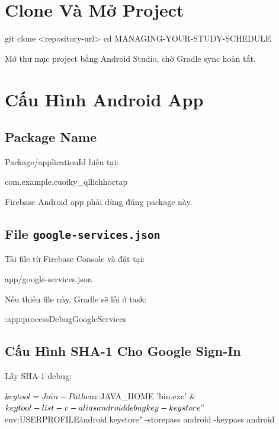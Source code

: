 \documentclass[12pt,a4paper]{report}
\begin{document}
\section{Clone Và Mở Project}

\begin{CodeBlock}
git clone <repository-url>
cd MANAGING-YOUR-STUDY-SCHEDULE
\end{CodeBlock}

Mở thư mục project bằng Android Studio, chờ Gradle sync hoàn tất.

\section{Cấu Hình Android App}

\subsection{Package Name}

Package/applicationId hiện tại:

\begin{CodeBlock}
com.example.cuoiky_qllichhoctap
\end{CodeBlock}

Firebase Android app phải dùng đúng package này.

\subsection{File \texttt{google-services.json}}

Tải file từ Firebase Console và đặt tại:

\begin{CodeBlock}
app/google-services.json
\end{CodeBlock}

Nếu thiếu file này, Gradle sẽ lỗi ở task:

\begin{CodeBlock}
:app:processDebugGoogleServices
\end{CodeBlock}

\subsection{Cấu Hình SHA-1 Cho Google Sign-In}

Lấy SHA-1 debug:

\begin{CodeBlock}
$keytool = Join-Path $env:JAVA_HOME 'bin\keytool.exe'
& $keytool -list -v -alias androiddebugkey -keystore "$env:USERPROFILE\.android\debug.keystore" -storepass android -keypass android
\end{CodeBlock}
\end{document}
